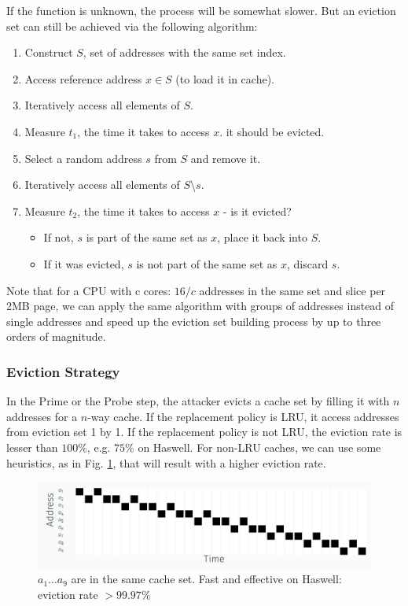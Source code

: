 If the function is unknown, the process will be somewhat slower. But an eviction set can still be achieved via the following algorithm:
\begin{enumerate}
    \item Construct $S$, set of addresses with the same set index.
    \item Access reference address $x \in S$ (to load it in cache).
    \item Iteratively access all elements of $S$.
    \item Measure $t_1$, the time it takes to access $x$. it should be evicted.
    \item Select a random address $s$ from $S$ and remove it.
    \item Iteratively access all elements of $S$\textbackslash$s$.
    \item Measure $t_2$, the time it takes to access $x$ - is it evicted?
    \begin{itemize}
        \item If not, $s$ is part of the same set as $x$, place it back into $S$.
        \item If it was evicted, $s$ is not part of the same set as $x$, discard $s$.
    \end{itemize}
\end{enumerate}
\noindent Note that for a CPU with c cores: $16/c$ addresses in the same set and slice per 2MB page, we can apply the same algorithm with groups of addresses instead of single addresses and speed up the eviction set building process by up to three orders of magnitude.

\subsubsection{Eviction Strategy}
In the Prime or the Probe step, the attacker evicts a cache set by filling it with $n$ addresses for a $n$-way cache. If the replacement policy is LRU, it access addresses from eviction set 1 by 1. If the replacement policy is not LRU, the eviction rate is lesser than $100\%$, e.g. $75\%$ on Haswell. For non-LRU caches, we can use some heuristics, as in Fig. \ref{fig:haswellstrategy}, that will result with a higher eviction rate.

\begin{figure}[h]
    \centering
    \includegraphics[width=\textwidth]{images/haswellstrategy.JPG}
    \caption{$a_1\dots a_9$ are in the same cache set. Fast and effective on Haswell: eviction rate $> 99.97\%$}
    \label{fig:haswellstrategy}
\end{figure}

